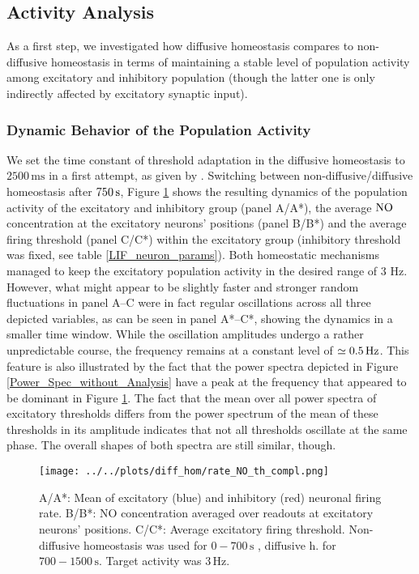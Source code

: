 \documentclass[10pt,a4paper]{article}
\begin{document}
\subsection{Activity Analysis} \label{activ_analys}
As a first step, we investigated how diffusive homeostasis compares to non-diffusive homeostasis in terms of maintaining a stable level of population activity among excitatory and inhibitory population (though the latter one is only indirectly affected by excitatory synaptic input).
\subsubsection{Dynamic Behavior of the Population Activity}
We set the time constant of threshold adaptation in the diffusive homeostasis to $\mathrm{2500\, ms}$ in a first attempt, as given by \cite{Sweeney_Paper}. Switching between non-diffusive/diffusive homeostasis after $\rm 750\, s$, Figure \ref{full_sim_osci} shows the resulting dynamics of the population activity of the excitatory and inhibitory group (panel A/A*), the average $\rm NO$ concentration at the excitatory neurons' positions (panel B/B*) and the average firing threshold (panel C/C*) within the excitatory group (inhibitory threshold was fixed, see table \ref{LIF_neuron_params}). Both homeostatic mechanisms managed to keep the excitatory population activity in the desired range of 3 Hz. However, what might appear to be slightly faster and stronger random fluctuations in panel A--C were in fact regular oscillations across all three depicted variables, as can be seen in panel A*--C*, showing the dynamics in a smaller time window. While the oscillation amplitudes undergo a rather unpredictable course, the frequency remains at a constant level of $\simeq \rm 0.5\, Hz$. This feature is also illustrated by the fact that the power spectra depicted in Figure \ref{Power_Spec_without_Analysis} have a peak at the frequency that appeared to be dominant in Figure \ref{full_sim_osci}. The fact that the mean over all power spectra of excitatory thresholds differs from the power spectrum of the mean of these thresholds in its amplitude indicates that not all thresholds oscillate at the same phase. The overall shapes of both spectra are still similar, though.
\begin{figure}
\begin{center}
\texttt{[image: ../../plots/diff\_hom/rate\_NO\_th\_compl.png]}
\end{center}
\caption[Time course of population firing rates, population mean of NO concentration and of excitatory threshold]{A/A*: Mean of excitatory (blue) and inhibitory (red) neuronal firing rate. B/B*: NO concentration averaged over readouts at excitatory neurons' positions. C/C*: Average excitatory firing threshold. Non-diffusive homeostasis was used for $\mathrm{0-700\, s}$ , diffusive h. for $\mathrm{700-1500\, s}$. Target activity was $\mathrm{3\, Hz}$.}
\label{full_sim_osci}
\end{figure}
\end{document}
